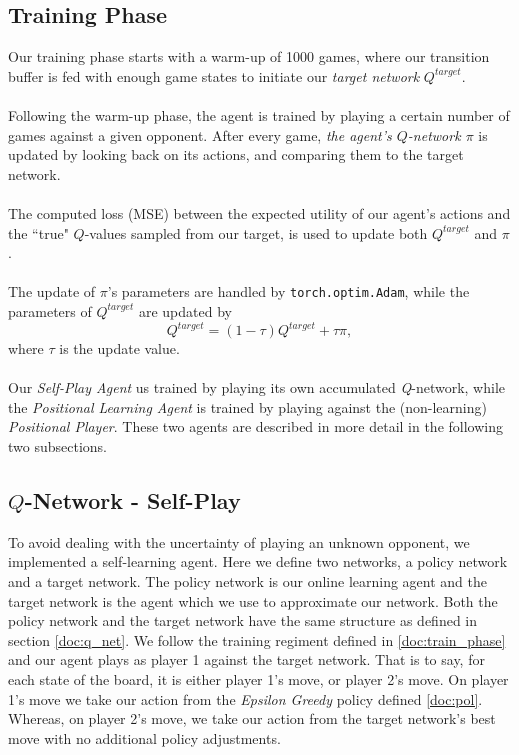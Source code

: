 \documentclass{article}
\begin{document}
\subsection{\label{doc:train_phase}Training Phase}
Our training phase starts with a warm-up of 1000 games, where our transition buffer is fed with enough game states to initiate our \textit{target network} $Q^{target}$.
\\\\
Following the warm-up phase, the agent is trained by playing a certain number of games against a given opponent. After every game,  \textit{the agent's $Q$-network $\pi$} is updated by looking back on its actions, and comparing them to the target network.
\\\\
The computed loss (MSE) between the expected utility of our agent's actions and the ``true" $Q$-values sampled from our target, is used to update both $Q^{target}$ and $\pi$.
\\\\
The update of $\pi$'s parameters are handled by \texttt{torch.optim.Adam}, while the parameters of $Q^{target}$ are updated by
$$Q^{target} = (1-\tau)Q^{target} + \tau\pi,$$ where $\tau$ is the update value.
\\\\
Our \textit{Self-Play Agent} us trained by playing its own accumulated \textit{Q}-network, while the \textit{Positional Learning Agent} is trained by playing against the (non-learning) \textit{Positional Player}. These two agents are described in more detail in the following two subsections.


\subsection{\label{doc:self_play}$Q$-Network - Self-Play}
To avoid dealing with the uncertainty of playing an unknown opponent, we implemented a self-learning agent. Here we define two networks, a policy network and a target network. The policy network is our online learning agent and the target network is the agent which we use to approximate our network. Both the policy network and the target network have the same structure as defined in section \ref{doc:q_net}. We follow the training regiment defined in \ref{doc:train_phase} and our agent plays as player 1 against the target network. That is to say, for each state of the board, it is either player 1's move, or player 2's move. On player 1's move we take our action from the \textit{Epsilon Greedy} policy defined \ref{doc:pol}. Whereas, on player 2's move, we take our action from the target network's best move with no additional policy adjustments.
\end{document}
